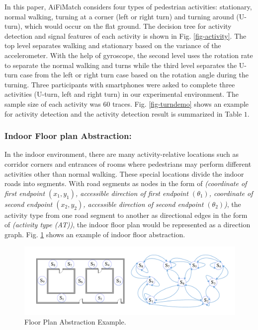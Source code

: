 \documentclass{llncs}
\begin{document}
In this paper, AiFiMatch considers four types of pedestrian activities: stationary, normal walking, turning at a corner (left or right turn) and turning around (U-turn), which would occur on the flat ground. The decision tree for activity detection and signal features of each activity is shown in Fig. \ref{fig-activity}. The top level separates walking and stationary based on the variance of the accelerometer. With the help of gyroscope, the second level uses the rotation rate to separate the normal walking and turns while the third level separates the U-turn case from the left or right turn case based on the rotation angle during the turning. Three participants with smartphones were asked to complete three activities (U-turn, left and right turn) in our experimental environment. The sample size of each activity was $60$ traces. Fig. \ref{fig-turndemo} shows an example for activity detection and the activity detection result is summarized in Table $1$.



\subsubsection{Indoor Floor plan Abstraction:}

In the indoor environment, there are many activity-relative locations such as corridor corners and entrances of rooms where pedestrians may perform different activities other than normal walking. These special locations divide the indoor roads into segments. With road segments as nodes in the form of \emph{(coordinate of first endpoint $(x_1,y_1)$, accessible direction of first endpoint $({\theta}_1)$, coordinate of second endpoint $(x_2,y_2)$, accessible direction of second endpoint $({\theta}_2)$)}, the activity type from one road segment to another as directional edges in the form of \emph{(activity type (AT))}, the indoor floor plan would be represented as a direction graph. Fig. \ref{fig-abstract} shows an example of indoor floor abstraction. 

\begin{figure}[!htbp]
	\vspace{-10pt}
	\centering
	\includegraphics[width=4.576in]{AiFiMatch-MapAbstract}
	\caption{Floor Plan Abstraction Example.}
	\label{fig-abstract}
	\vspace{-10pt}
\end{figure}
\end{document}

